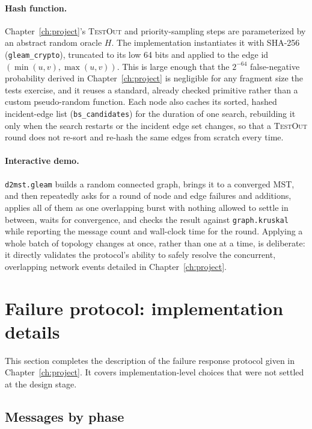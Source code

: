 \paragraph{Hash function.}
Chapter~\ref{ch:project}'s \textsc{TestOut} and priority-sampling steps are parameterized
by an abstract random oracle $H$. The implementation instantiates it with SHA-256
(\texttt{gleam\_crypto}), truncated to its low 64 bits and applied to the edge id
$(\min(u,v), \max(u,v))$. This is large enough that the $2^{-64}$ false-negative
probability derived in Chapter~\ref{ch:project} is negligible for any fragment size the
tests exercise, and it reuses a standard, already checked primitive rather than a custom
pseudo-random function. Each node also caches its sorted, hashed incident-edge list
(\texttt{bs\_candidates}) for the duration of one search, rebuilding it only when the
search restarts or the incident edge set changes, so that a \textsc{TestOut} round does
not re-sort and re-hash the same edges from scratch every time.


\paragraph{Interactive demo.}\label{sec:interactive-main}

\texttt{d2mst.gleam} builds a random connected graph, brings it to a converged MST, and
then repeatedly asks for a round of node and edge failures and additions, applies all of
them as one overlapping burst with nothing allowed to settle in between, waits for
convergence, and checks the result against \texttt{graph.kruskal} while reporting the
message count and wall-clock time for the round. Applying a whole batch of topology
changes at once, rather than one at a time, is deliberate: it directly validates the
protocol's ability to safely resolve the concurrent, overlapping network events detailed
in Chapter~\ref{ch:project}.

\section{Failure protocol: implementation details}

This section completes the description of the failure response protocol
given in Chapter~\ref{ch:project}. It covers implementation-level choices that were not
settled at the design stage.

\subsection{Messages by phase}\label{sec:failure-messages}


